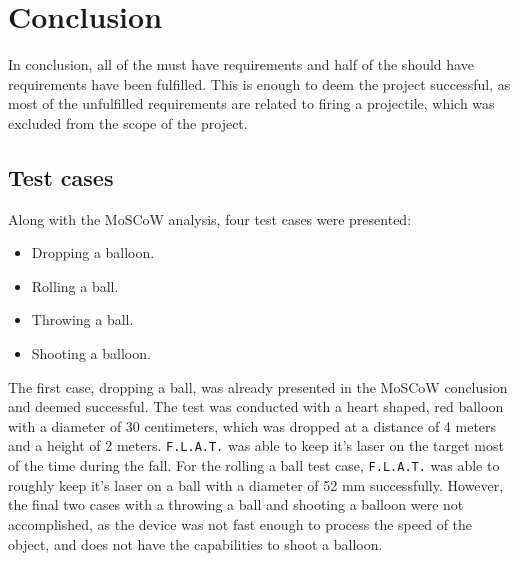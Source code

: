 \section{Conclusion}\label{Conclusion:Conclusion}
In conclusion, all of the must have requirements and half of the should have requirements have been fulfilled.
This is enough to deem the project successful, as most of the unfulfilled requirements are related to firing a projectile, which was excluded from the scope of the project. 

\subsection{Test cases}
Along with the MoSCoW analysis, four test cases were presented: 
\begin{itemize}
    \item Dropping a balloon.
    \item Rolling a ball.
    \item Throwing a ball.
    \item Shooting a balloon.
\end{itemize}

The first case, dropping a ball, was already presented in the MoSCoW conclusion and deemed successful.
The test was conducted with a heart shaped, red balloon with a diameter of 30 centimeters, which was dropped at a distance of 4 meters and a height of 2 meters. 
\texttt{F.L.A.T.} was able to keep it's laser on the target most of the time during the fall. 
For the rolling a ball test case, \texttt{F.L.A.T.} was able to roughly keep it's laser on a ball with a diameter of 52 mm successfully. 
However, the final two cases with a throwing a ball and shooting a balloon were not accomplished, as the device was not fast enough to process the speed of the object, and does not have the capabilities to shoot a balloon.

